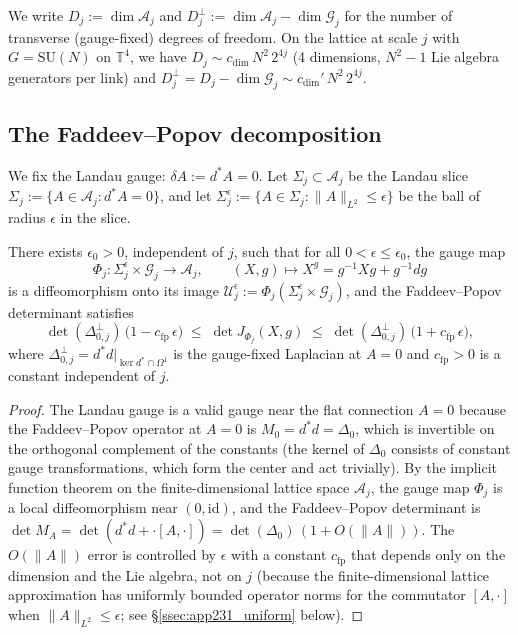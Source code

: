 We write $D_{j}:=\dim\mathcal{A}_{j}$ and
$D_{j}^{\perp}:=\dim\mathcal{A}_{j}-\dim\mathcal{G}_{j}$ for the
number of transverse (gauge-fixed) degrees of freedom. On the lattice
at scale $j$ with $G=\mathrm{SU}(N)$ on $\mathbb{T}^{4}$, we have
$D_{j}\sim c_{\dim}\,N^{2}\,2^{4j}$ (4 dimensions, $N^{2}-1$ Lie
algebra generators per link) and $D_{j}^{\perp}=D_{j}-\dim\mathcal{
G}_{j}\sim c_{\dim}'\,N^{2}\,2^{4j}$.

\subsection{The Faddeev--Popov decomposition}
\label{ssec:app231_fp}

We fix the Landau gauge: $\delta A:=d^{*}A=0$. Let
$\Sigma_{j}\subset\mathcal{A}_{j}$ be the Landau slice
$\Sigma_{j}:=\{A\in\mathcal{A}_{j}:d^{*}A=0\}$, and let
$\Sigma_{j}^{\epsilon}:=\{A\in\Sigma_{j}:\|A\|_{L^{2}}\le\epsilon\}$
be the ball of radius $\epsilon$ in the slice.

\begin{lemma}
\label{lem:fp_formula}
There exists $\epsilon_{0}>0$, independent of $j$, such that for all
$0<\epsilon\le\epsilon_{0}$, the gauge map
\begin{equation}
\label{eq:gauge_map}
  \Phi_{j}:\Sigma_{j}^{\epsilon}\times\mathcal{G}_{j}\to\mathcal{A}_{j},
  \qquad (X,g)\mapsto X^{g}=g^{-1}Xg+g^{-1}dg
\end{equation}
is a diffeomorphism onto its image
$\mathcal{U}_{j}^{\epsilon}:=\Phi_{j}(\Sigma_{j}^{\epsilon}\times
\mathcal{G}_{j})$, and the Faddeev--Popov determinant satisfies
\begin{equation}
\label{eq:fp_det_bound}
  \det(\Delta_{0,j}^{\perp})\,\bigl(1-c_{\mathrm{fp}}\,\epsilon\bigr)
  \;\le\;\det J_{\Phi_{j}}(X,g)\;\le\;
  \det(\Delta_{0,j}^{\perp})\,\bigl(1+c_{\mathrm{fp}}\,\epsilon\bigr),
\end{equation}
where $\Delta_{0,j}^{\perp}=d^{*}d\big|_{\ker d^{*}\cap\Omega^{1}}$
is the gauge-fixed Laplacian at $A=0$ and $c_{\mathrm{fp}}>0$ is a
constant independent of $j$.
\end{lemma}

\begin{proof}
The Landau gauge is a valid gauge near the flat connection $A=0$
because the Faddeev--Popov operator at $A=0$ is
$M_{0}=d^{*}d=\Delta_{0}$, which is invertible on the orthogonal
complement of the constants (the kernel of $\Delta_{0}$ consists of
constant gauge transformations, which form the center and act
trivially). By the implicit function theorem on the finite-dimensional
lattice space $\mathcal{A}_{j}$, the gauge map $\Phi_{j}$ is a local
diffeomorphism near $(0,\mathrm{id})$, and the Faddeev--Popov
determinant is $\det M_{A}=\det(d^{*}d+{\cdot}[A,\cdot])=
\det(\Delta_{0})\,(1+O(\|A\|))$. The $O(\|A\|)$ error is controlled
by $\epsilon$ with a constant $c_{\mathrm{fp}}$ that depends only on
the dimension and the Lie algebra, not on $j$ (because the
finite-dimensional lattice approximation has uniformly bounded
operator norms for the commutator $[A,\cdot]$ when $\|A\|_{L^{2}}\le
\epsilon$; see \S\ref{ssec:app231_uniform} below).
\end{proof}


